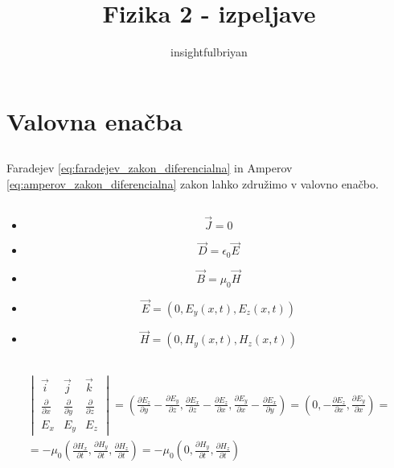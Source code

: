 \documentclass[a4paper,12pt]{article}
\title{Fizika 2 - izpeljave}
\author{insightfulbriyan}
\begin{document}
\pagestyle{empty}

\begin{titlingpage}
    \maketitle
\end{titlingpage}

\setcounter{tocdepth}{1}
\tableofcontents
\newpage


\section{Valovna enačba}
\subsection{}
Faradejev \ref{eq:faradejev_zakon_diferencialna} in Amperov \ref{eq:amperov_zakon_diferencialna} zakon lahko združimo v valovno enačbo.

\subsection{}
\begin{itemize}[itemsep=-20pt]
    \item $$\vec J = 0$$
    \item $$\vec D = \epsilon_0 \vec E$$
    \item $$\vec B = \mu_0 \vec H$$
    \item $$\vec E = (0, E_y(x, t), E_z(x, t))$$
    \item $$\vec H = (0, H_y(x, t), H_z(x, t))$$
\end{itemize}

\subsection{}
\begin{multline}
    \begin{vmatrix}
        \vec{i}                     & \vec{j}                     & \vec{k}                     \\
        \frac{\partial}{\partial x} & \frac{\partial}{\partial y} & \frac{\partial}{\partial z} \\
        E_x                         & E_y                         & E_z
    \end{vmatrix} = \left( \frac{\partial E_z}{\partial y} - \frac{\partial E_y}{\partial z}, \frac{\partial E_x}{\partial z} - \frac{\partial E_z}{\partial x}, \frac{\partial E_y}{\partial x} - \frac{\partial E_x}{\partial y} \right)
    = \left( 0, -\frac{\partial E_z}{\partial x}, \frac{\partial E_y}{\partial x} \right) = \\
    = -\mu_0 \left( \frac{\partial H_x}{\partial t}, \frac{\partial H_y}{\partial t}, \frac{\partial H_z}{\partial t} \right) = -\mu_0 \left( 0, \frac{\partial H_y}{\partial t}, \frac{\partial H_z}{\partial t} \right)
\end{multline}
\end{document}
